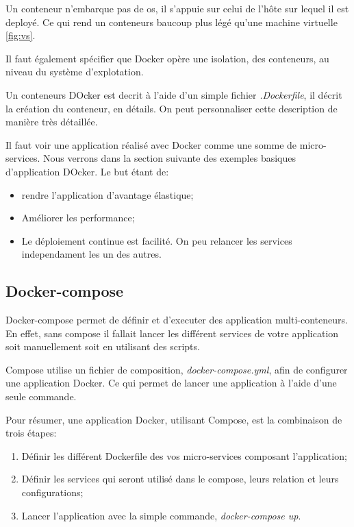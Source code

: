 Un conteneur n'embarque pas de \gls{os}, il s'appuie sur celui de l'hôte sur lequel il est deployé. Ce qui rend un conteneurs baucoup plus légé qu'une machine virtuelle \ref{fig:vs}.

Il faut également spécifier que Docker opère une isolation, des conteneurs, au niveau du système d'explotation. 

Un conteneurs DOcker est decrit à l'aide d'un simple fichier \emph{.Dockerfile}, il décrit la création du conteneur, en détails. On peut personnaliser cette description de manière très détaillée. 

Il faut voir une application réalisé avec Docker comme une somme de micro-services. Nous verrons dans la section suivante des exemples basiques d'application DOcker. Le but étant de:

\begin{itemize}
\item rendre l'application d'avantage élastique;
\item Améliorer les performance;
\item Le déploiement continue est facilité. On peu relancer les services independament les un des autres.
\end{itemize}


\subsection{Docker-compose}
Docker-compose permet de définir et d'executer des application multi-conteneurs. En effet, sans compose il fallait lancer les différent services de votre application soit manuellement soit en utilisant des scripts.

Compose utilise un fichier de composition, \emph{docker-compose.yml}, afin de configurer une application Docker. Ce qui permet de lancer une application à l'aide d'une seule commande. 

Pour résumer, une application Docker, utilisant Compose, est la combinaison de trois étapes:

\begin{enumerate}
\item Définir les différent Dockerfile des vos micro-services composant l'application;
\item Définir les services qui seront utilisé dans le compose, leurs relation et leurs configurations;
\item Lancer l'application avec la simple commande, \emph{docker-compose up}.
\end{enumerate}

